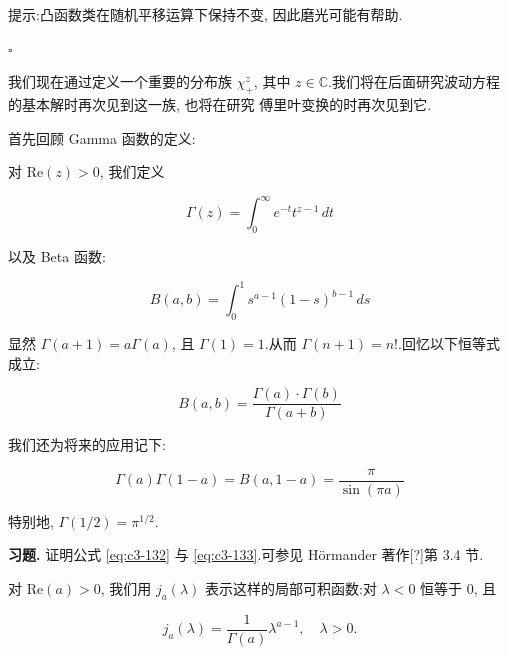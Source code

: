 提示:凸函数类在随机平移运算下保持不变, 因此磨光可能有帮助.

\begin{center}$\square$\end{center}

我们现在通过定义一个重要的分布族 $\chi_+^z$, 其中 $z\in\mathbb{C}$.我们将在后面研究波动方程的基本解时再次见到这一族, 也将在研究 傅里叶变换的时再次见到它.

首先回顾 Gamma 函数的定义:

\begin{definition}\label{def:c3-3.1}
对 $\mathrm{Re}(z)>0$, 我们定义

\begin{equation}
\Gamma(z) = \int_0^{\infty}e^{-t}t^{z-1}\, dt\label{eq:c3-130}
\end{equation}

以及 Beta 函数:

\begin{equation}
B(a, b) = \int_0^1s^{a-1}(1-s)^{b-1}\, ds\label{eq:c3-131}
\end{equation}
\end{definition}

显然 $\Gamma(a+1) = a\Gamma(a)$, 且 $\Gamma(1) = 1$.从而 $\Gamma(n+1) = n!$.回忆以下恒等式成立:

\begin{equation}
B(a, b) = \frac{\Gamma(a)\cdot\Gamma(b)}{\Gamma(a+b)}\label{eq:c3-132}
\end{equation}

我们还为将来的应用记下:

\begin{equation}
\Gamma(a)\Gamma(1-a) = B(a, 1-a) = \frac{\pi}{\sin(\pi a)}\label{eq:c3-133}
\end{equation}

特别地, $\Gamma(1/2) = \pi^{1/2}$.

\textbf{习题.} 证明公式 \eqref{eq:c3-132} 与 \eqref{eq:c3-133}.可参见 Hörmander 著作[?]第 3.4 节.

\begin{definition}\label{def:c3-3.2}
对 $\mathrm{Re}(a)>0$, 我们用 $j_a(\lambda)$ 表示这样的局部可积函数:对 $\lambda<0$ 恒等于 0, 且

\begin{equation}
j_a(\lambda) = \frac{1}{\Gamma(a)}\lambda^{a-1}, \quad \lambda>0.\label{eq:c3-134}
\end{equation}
\end{definition}

